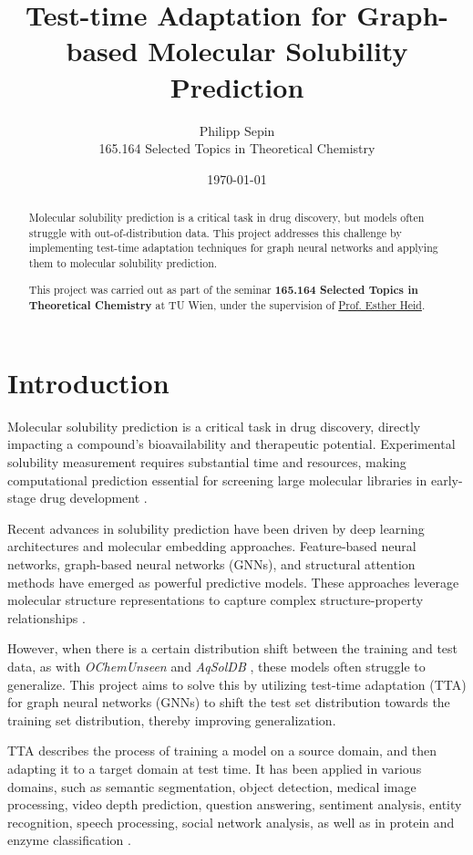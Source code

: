 \documentclass[11pt,a4paper]{article}
\title{Test-time Adaptation for Graph-based Molecular Solubility Prediction}
\author{Philipp Sepin\\
        165.164 Selected Topics in Theoretical Chemistry}
\date{\today}
\begin{document}
\maketitle

\begin{abstract}
        Molecular solubility prediction is a critical task in drug discovery, but models often struggle with out-of-distribution data. This project addresses this challenge by implementing test-time adaptation techniques for graph neural networks and applying them to molecular solubility prediction.

        This project was carried out as part of the seminar \textbf{165.164 Selected Topics in Theoretical Chemistry} at TU Wien, under the supervision of \href{https://hesther.github.io/}{Prof. Esther Heid}.
\end{abstract}

\section{Introduction}
Molecular solubility prediction is a critical task in drug discovery, directly impacting a compound's bioavailability and therapeutic potential. Experimental solubility measurement requires substantial time and resources, making computational prediction essential for screening large molecular libraries in early-stage drug development \cite{llompart2024will}.

Recent advances in solubility prediction have been driven by deep learning architectures and molecular embedding approaches. Feature-based neural networks, graph-based neural networks (GNNs), and structural attention methods have emerged as powerful predictive models. These approaches leverage molecular structure representations to capture complex structure-property relationships \cite{llompart2024will}.

However, when there is a certain distribution shift between the training and test data, as with \textit{OChemUnseen} \cite{llompart2024will} and \textit{AqSolDB} \cite{sorkun2019aqsoldb}, these models often struggle to generalize. This project aims to solve this by utilizing test-time adaptation (TTA) for graph neural networks (GNNs) to shift the test set distribution towards the training set distribution, thereby improving generalization.

TTA describes the process of training a model on a source domain, and then adapting it to a target domain at test time. It has been applied in various domains, such as semantic segmentation, object detection, medical image processing, video depth prediction, question answering, sentiment analysis, entity recognition, speech processing, social network analysis, as well as in protein and enzyme classification \cite{liang2025comprehensive,cui2025online}.
\end{document}
